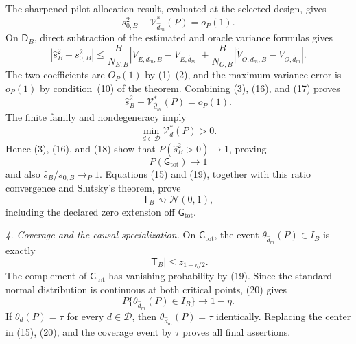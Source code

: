 The sharpened pilot allocation result, evaluated at the selected design, gives
\[
 s_{0,B}^2-\mathcal V_{\widehat d_m}^*(P)=o_P(1). \tag{16}
\]
On \(\mathsf D_B\), direct subtraction of the estimated and oracle variance formulas gives
\[
 |\widehat s_B^2-s_{0,B}^2|
 \le \frac{B}{N_{E,B}}
 |\widetilde V_{E,\widehat d_m,B}-V_{E,\widehat d_m}|
 +\frac{B}{N_{O,B}}
 |\widetilde V_{O,\widehat d_m,B}-V_{O,\widehat d_m}|. \tag{17}
\]
The two coefficients are \(O_P(1)\) by (1)--(2), and the maximum variance error is \(o_P(1)\) by condition~(10) of the theorem.  Combining (3), (16), and (17) proves
\[
 \widehat s_B^2-\mathcal V_{\widehat d_m}^*(P)=o_P(1). \tag{18}
\]
The finite family and nondegeneracy imply
\[
 \min_{d\in\mathcal D}\mathcal V_d^*(P)>0.
\]
Hence (3), (16), and (18) show that \(P(\widehat s_B^2>0)\to1\), proving
\[
 P(\mathsf G_{\mathrm{tot}})\longrightarrow1 \tag{19}
\]
and also \(\widehat s_B/s_{0,B}\to_P1\).  Equations (15) and (19), together with this ratio convergence and Slutsky's theorem, prove
\[
 \mathsf T_B\rightsquigarrow\mathcal N(0,1), \tag{20}
\]
including the declared zero extension off \(\mathsf G_{\mathrm{tot}}\).

\emph{4. Coverage and the causal specialization.}
On \(\mathsf G_{\mathrm{tot}}\), the event \(\theta_{\widehat d_m}(P)\in I_B\) is exactly
\[
 |\mathsf T_B|\le z_{1-\eta/2}.
\]
The complement of \(\mathsf G_{\mathrm{tot}}\) has vanishing probability by (19).  Since the standard normal distribution is continuous at both critical points, (20) gives
\[
 P\{\theta_{\widehat d_m}(P)\in I_B\}\longrightarrow1-\eta.
\]
If \(\theta_d(P)=\tau\) for every \(d\in\mathcal D\), then \(\theta_{\widehat d_m}(P)=\tau\) identically.  Replacing the center in (15), (20), and the coverage event by \(\tau\) proves all final assertions.